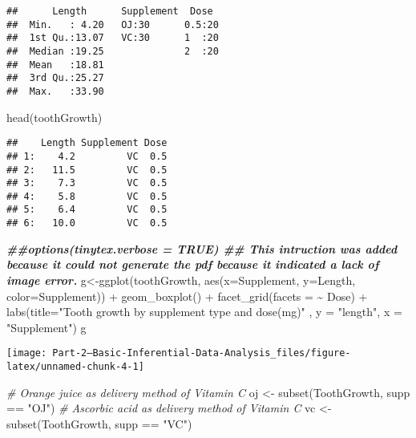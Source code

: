 \documentclass[
]{article}
\newenvironment{Shaded}{\begin{snugshade}}{\end{snugshade}}
\newcommand{\AttributeTok}[1]{\textcolor[rgb]{0.77,0.63,0.00}{#1}}
\newcommand{\CommentTok}[1]{\textcolor[rgb]{0.56,0.35,0.01}{\textit{#1}}}
\newcommand{\DocumentationTok}[1]{\textcolor[rgb]{0.56,0.35,0.01}{\textbf{\textit{#1}}}}
\newcommand{\FunctionTok}[1]{\textcolor[rgb]{0.00,0.00,0.00}{#1}}
\newcommand{\NormalTok}[1]{#1}
\newcommand{\OtherTok}[1]{\textcolor[rgb]{0.56,0.35,0.01}{#1}}
\newcommand{\SpecialCharTok}[1]{\textcolor[rgb]{0.00,0.00,0.00}{#1}}
\newcommand{\StringTok}[1]{\textcolor[rgb]{0.31,0.60,0.02}{#1}}
\begin{document}
\begin{verbatim}
##      Length      Supplement  Dose   
##  Min.   : 4.20   OJ:30      0.5:20  
##  1st Qu.:13.07   VC:30      1  :20  
##  Median :19.25              2  :20  
##  Mean   :18.81                      
##  3rd Qu.:25.27                      
##  Max.   :33.90
\end{verbatim}

\begin{Shaded}
\begin{Highlighting}[]
\FunctionTok{head}\NormalTok{(toothGrowth)}
\end{Highlighting}
\end{Shaded}

\begin{verbatim}
##    Length Supplement Dose
## 1:    4.2         VC  0.5
## 2:   11.5         VC  0.5
## 3:    7.3         VC  0.5
## 4:    5.8         VC  0.5
## 5:    6.4         VC  0.5
## 6:   10.0         VC  0.5
\end{verbatim}

\begin{Shaded}
\begin{Highlighting}[]
 \DocumentationTok{\#\#options(tinytex.verbose = TRUE)  \#\# This intruction was added because it could not generate the pdf because it indicated a lack of image error. }
\NormalTok{ g}\OtherTok{\textless{}{-}}\FunctionTok{ggplot}\NormalTok{(toothGrowth, }\FunctionTok{aes}\NormalTok{(}\AttributeTok{x=}\NormalTok{Supplement, }\AttributeTok{y=}\NormalTok{Length, }\AttributeTok{color=}\NormalTok{Supplement)) }\SpecialCharTok{+}
    \FunctionTok{geom\_boxplot}\NormalTok{() }\SpecialCharTok{+} \FunctionTok{facet\_grid}\NormalTok{(}\AttributeTok{facets =} \SpecialCharTok{\textasciitilde{}}\NormalTok{ Dose) }\SpecialCharTok{+} 
   \FunctionTok{labs}\NormalTok{(}\AttributeTok{title=}\StringTok{"Tooth growth by supplement type and dose(mg)"}\NormalTok{ , }
        \AttributeTok{y =} \StringTok{"length"}\NormalTok{, }\AttributeTok{x =} \StringTok{"Supplement"}\NormalTok{)}
\NormalTok{ g}
\end{Highlighting}
\end{Shaded}

\begin{center}\texttt{[image: Part-2--Basic-Inferential-Data-Analysis\_files/figure-latex/unnamed-chunk-4-1]} \end{center}

\begin{Shaded}
\begin{Highlighting}[]
\CommentTok{\# Orange juice as delivery method of Vitamin C}
\NormalTok{oj }\OtherTok{\textless{}{-}} \FunctionTok{subset}\NormalTok{(ToothGrowth, supp }\SpecialCharTok{==} \StringTok{"OJ"}\NormalTok{)}
\CommentTok{\# Ascorbic acid as delivery method of Vitamin C}
\NormalTok{vc }\OtherTok{\textless{}{-}} \FunctionTok{subset}\NormalTok{(ToothGrowth, supp }\SpecialCharTok{==} \StringTok{"VC"}\NormalTok{)}
\end{Highlighting}
\end{Shaded}
\end{document}
